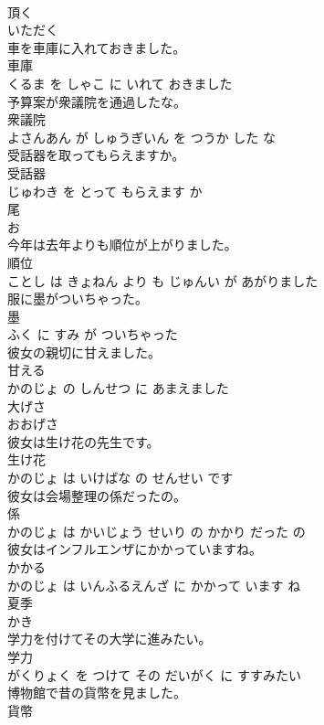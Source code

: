 \documentclass[8pt]{extreport}
\begin{document}
\begin{CJK}{UTF8}{min}
\\	頂く	
\\	いただく		
\\	車を車庫に入れておきました。	
\\	車庫 
\\	くるま を しゃこ に いれて おきました			
\\	予算案が衆議院を通過したな。	
\\	衆議院 
\\	よさんあん が しゅうぎいん を つうか した な			
\\	受話器を取ってもらえますか。	
\\	受話器 
\\	じゅわき を とって もらえます か			
\\	尾	
\\	お		
\\	今年は去年よりも順位が上がりました。	
\\	順位 
\\	ことし は きょねん より も じゅんい が あがりました			
\\	服に墨がついちゃった。	
\\	墨 
\\	ふく に すみ が ついちゃった			
\\	彼女の親切に甘えました。	
\\	甘える 
\\	かのじょ の しんせつ に あまえました			
\\	大げさ	
\\	おおげさ		
\\	彼女は生け花の先生です。	
\\	生け花 
\\	かのじょ は いけばな の せんせい です			
\\	彼女は会場整理の係だったの。	
\\	係 
\\	かのじょ は かいじょう せいり の かかり だった の			
\\	彼女はインフルエンザにかかっていますね。	
\\	かかる 
\\	かのじょ は いんふるえんざ に かかって います ね			
\\	夏季	
\\	かき		
\\	学力を付けてその大学に進みたい。	
\\	学力 
\\	がくりょく を つけて その だいがく に すすみたい			
\\	博物館で昔の貨幣を見ました。	
\\	貨幣 

\end{CJK}
\end{document}
